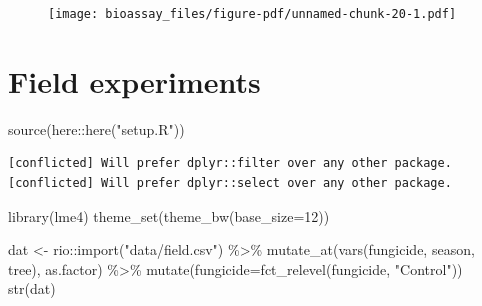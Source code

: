\documentclass[
  letterpaper,
  DIV=11,
  numbers=noendperiod]{scrreport}
\newenvironment{Shaded}{\begin{snugshade}}{\end{snugshade}}
\newcommand{\AttributeTok}[1]{\textcolor[rgb]{0.40,0.45,0.13}{#1}}
\newcommand{\DecValTok}[1]{\textcolor[rgb]{0.68,0.00,0.00}{#1}}
\newcommand{\FunctionTok}[1]{\textcolor[rgb]{0.28,0.35,0.67}{#1}}
\newcommand{\NormalTok}[1]{\textcolor[rgb]{0.00,0.23,0.31}{#1}}
\newcommand{\OtherTok}[1]{\textcolor[rgb]{0.00,0.23,0.31}{#1}}
\newcommand{\SpecialCharTok}[1]{\textcolor[rgb]{0.37,0.37,0.37}{#1}}
\newcommand{\StringTok}[1]{\textcolor[rgb]{0.13,0.47,0.30}{#1}}
\begin{document}
\begin{figure}[H]

{\centering \texttt{[image: bioassay\_files/figure-pdf/unnamed-chunk-20-1.pdf]}

}

\end{figure}


\hypertarget{field-experiments}{%
\chapter{Field experiments}\label{field-experiments}}

\begin{Shaded}
\begin{Highlighting}[]
\FunctionTok{source}\NormalTok{(here}\SpecialCharTok{::}\FunctionTok{here}\NormalTok{(}\StringTok{"setup.R"}\NormalTok{))}
\end{Highlighting}
\end{Shaded}

\begin{verbatim}
[conflicted] Will prefer dplyr::filter over any other package.
[conflicted] Will prefer dplyr::select over any other package.
\end{verbatim}

\begin{Shaded}
\begin{Highlighting}[]
\FunctionTok{library}\NormalTok{(lme4)}
\FunctionTok{theme\_set}\NormalTok{(}\FunctionTok{theme\_bw}\NormalTok{(}\AttributeTok{base\_size=}\DecValTok{12}\NormalTok{))}
\end{Highlighting}
\end{Shaded}

\begin{Shaded}
\begin{Highlighting}[]
\NormalTok{dat }\OtherTok{\textless{}{-}}\NormalTok{ rio}\SpecialCharTok{::}\FunctionTok{import}\NormalTok{(}\StringTok{"data/field.csv"}\NormalTok{) }\SpecialCharTok{\%\textgreater{}\%} 
  \FunctionTok{mutate\_at}\NormalTok{(}\FunctionTok{vars}\NormalTok{(fungicide, season, tree), as.factor) }\SpecialCharTok{\%\textgreater{}\%} 
  \FunctionTok{mutate}\NormalTok{(}\AttributeTok{fungicide=}\FunctionTok{fct\_relevel}\NormalTok{(fungicide, }\StringTok{"Control"}\NormalTok{))}
\FunctionTok{str}\NormalTok{(dat)}
\end{Highlighting}
\end{Shaded}
\end{document}
